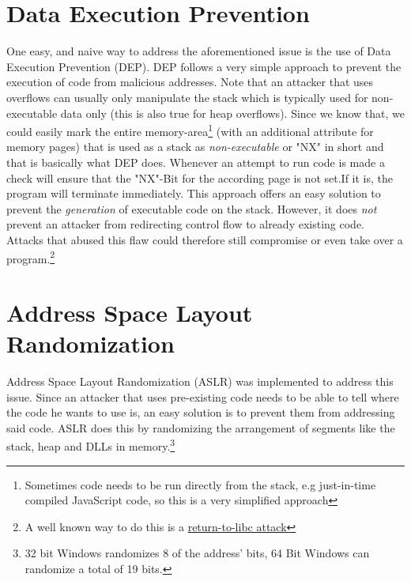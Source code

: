 \documentclass[10pt,twocolumn,a4paper]{article}
\begin{document}
\section{Data Execution Prevention}\label{sec:DEP}
One easy, and naive way to address the aforementioned issue is the use of Data Execution Prevention (DEP).
DEP follows a very simple approach to prevent the execution of code from malicious addresses.
Note that an attacker that uses overflows can usually only manipulate the stack which is typically used for non-executable data only (this is also true for heap overflows).
Since we know that, we could easily mark the entire memory-area\footnote{Sometimes code needs to be run directly from the stack, e.g just-in-time compiled JavaScript code, so this is a very simplified approach} (with an additional attribute for memory pages) that is used as a stack as \emph{non-executable} or "NX" in short and that is basically what DEP does.
Whenever an attempt to run code is made a check will ensure that the "NX"-Bit for the according page is not set.If it is, the program will terminate immediately.
This approach offers an easy solution to prevent the \emph{generation} of executable code on the stack. However, it does \emph{not} prevent an attacker from redirecting control flow to already existing code. Attacks that abused this flaw could therefore still compromise or even take over a program.\footnote{A well known way to do this is a \hyperref{https://en.wikipedia.org/wiki/Return-to-libc_attack}{Return-to-Libc Exploits}{name}{return-to-libc attack}}

\section{Address Space Layout Randomization}\label{sec:ASLR}
Address Space Layout Randomization (ASLR) was implemented to address this issue.
Since an attacker that uses pre-existing code needs to be able to tell where the code he wants to use is, an easy solution is to prevent them from addressing said code.
ASLR does this by randomizing the arrangement of segments like the stack, heap and DLLs in memory.\footnote{32 bit Windows randomizes 8 of the address' bits, 64 Bit Windows can randomize a total of 19 bits.}
\end{document}
